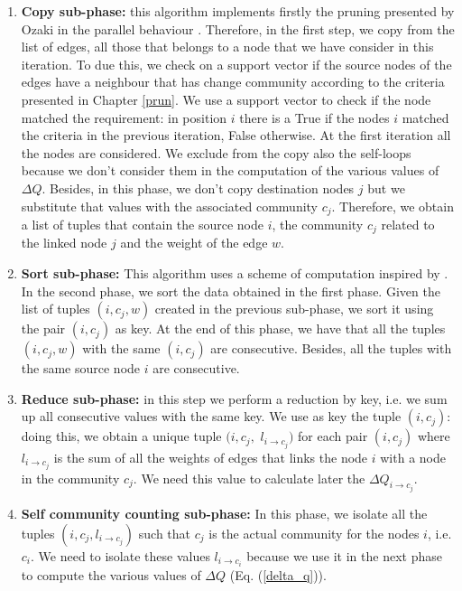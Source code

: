 \begin{enumerate}
	\item \textbf{Copy sub-phase:}  this algorithm implements firstly the pruning presented by Ozaki in the parallel behaviour \cite{pruning}. Therefore, in the first step, we copy from the list of edges, all those that belongs to a node that we have consider in this iteration. To due this, we check on a support vector if the source nodes of the edges have a neighbour that has change community according to the criteria presented in Chapter \ref{prun}. We use a support vector to check if the node matched the requirement: in position $i$ there is a True if the nodes $i$ matched the criteria in the previous iteration, False otherwise. At the first iteration all the nodes are considered. We exclude from the copy also the self-loops because we don't consider them in the computation of the various values of $\Delta Q$. Besides, in this phase, we don't copy destination nodes $j$ but we substitute that values with the associated community $c_j$. Therefore, we obtain a list of tuples that contain the source node $i$, the community $c_j$ related to the linked node $j$ and the weight of the edge $w$.  
	
	\item \textbf{Sort sub-phase:} This algorithm uses a scheme of computation inspired by \cite{cheong2013hierarchical}. In the second phase, we sort the data obtained in the first phase. Given the list of tuples $(i, c_j, w)$ created in the previous sub-phase, we sort it using the pair $(i, c_j)$ as key.  At the end of this phase, we have that all the tuples $(i, c_j, w)$ with the same $(i, c_j)$ are consecutive. Besides, all the tuples with the same source node $i$ are consecutive.
	
	\item \textbf{Reduce sub-phase:} in this step we perform a reduction by key, i.e. we sum up all consecutive values with the same key. We use as key the tuple $(i, c_j)$: doing this, we obtain a unique tuple $(i, c_j,$  $l_{i\rightarrow c_j})$ for each pair $(i, c_j)$ where $l_{i\rightarrow c_j}$ is the sum of all the weights of edges that links the node $i$ with a node in the community $c_j$. We need this value to calculate later the $\Delta Q_{i\rightarrow c_j}$.
	
	\item \textbf{Self community counting  sub-phase:} In this phase, we isolate all the tuples  $(i, c_j, l_{i\rightarrow c_j})$ such that 
	$c_j$ is the actual community for the nodes $i$, i.e. $c_i$. We need to isolate these values $l_{i\rightarrow c_i}$ because we use it in the next phase to compute the various values of $\Delta Q$ (Eq. (\ref{delta_q})).
	

\end{enumerate}
